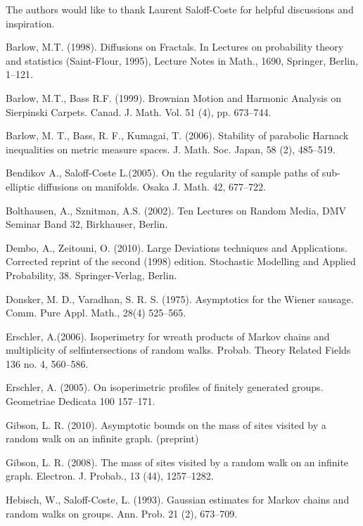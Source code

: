 \documentclass[letterpaper,oneside,english]{amsart}
\begin{document}
The authors would like to thank Laurent Saloff-Coste for helpful discussions and inspiration.

 
\begin{thebibliography}{1}

Barlow, M.T. (1998).
Diffusions on Fractals.
In Lectures on probability theory and statistics (Saint-Flour, 1995),
Lecture Notes in Math., 1690, Springer, Berlin, 1--121.

Barlow,  M.T., Bass R.F. (1999).
Brownian Motion and Harmonic Analysis on Sierpinski Carpets.
Canad. J. Math. Vol. 51 (4), pp. 673--744.

Barlow, M. T., Bass, R. F., Kumagai, T. (2006).
Stability of parabolic {H}arnack inequalities on metric measure spaces.
{J. Math. Soc. Japan}, {58} (2), 485--519.

Bendikov A., Saloff-Coste L.(2005).
On the regularity of sample paths of sub-elliptic diffusions on manifolds.
 { Osaka J. Math.} { 42}, 677--722.

Bolthausen, A., Sznitman, A.S. (2002).
Ten Lectures on Random Media, 
{DMV Seminar Band 32}, Birkhauser, Berlin.

Dembo, A., Zeitouni, O. (2010).
Large Deviations techniques and Applications.
Corrected reprint of the second (1998) edition. Stochastic Modelling and Applied Probability, 38. Springer-Verlag, Berlin.

Donsker, M. D., Varadhan, S. R. S. (1975).
Asymptotics for the {W}iener sausage.
{Comm. Pure Appl. Math.}, {28}(4) 525--565.
 
Erschler, A.(2006).
Isoperimetry for wreath products of Markov chains and multiplicity of selfintersections of random walks.
 Probab. Theory Related Fields  136 no. 4, 560--586. 
 
Erschler, A. (2005).
On isoperimetric profiles of finitely generated groups.
{ Geometriae Dedicata} {100} 157--171.

Gibson, L. R. (2010).
Asymptotic bounds on the mass of sites visited by a random walk on an infinite graph.
 { (preprint)}
 
Gibson, L. R. (2008).
The mass of sites visited by a random walk on an infinite graph.
{Electron. J. Probab.}, {13} (44), 1257--1282.

Hebisch, W., Saloff-Coste, L. (1993).
Gaussian estimates for {M}arkov chains and random walks on groups.
 { Ann. Prob.} { 21} (2), 673--709. 


\end{thebibliography}
\end{document}
